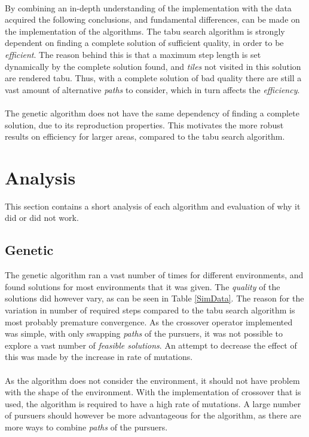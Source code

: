 \\By combining an in-depth understanding of the implementation with the data acquired the following conclusions, and fundamental differences, can be made on the implementation of the algorithms. The tabu search algorithm is strongly dependent on finding a complete solution of sufficient quality, in order to be \emph{efficient}. The reason behind this is that a maximum step length is set dynamically by the complete solution found, and \emph{tiles} not visited in this solution are rendered tabu. Thus, with a complete solution of bad quality there are still a vast amount of alternative \emph{paths} to consider, which in turn affects the \emph{efficiency}.\\
\\The genetic algorithm does not have the same dependency of finding a complete solution, due to its reproduction properties. This motivates the more robust results on efficiency for larger areas, compared to the tabu search algorithm. 
	
\section{Analysis}
This section contains a short analysis of each algorithm and evaluation of why it did or did not work.
\subsection{Genetic}
The genetic algorithm ran a vast number of times for different environments, and found solutions for most environments that it was given. The \emph{quality} of the solutions did however vary, as can be seen in Table \ref{SimData}. The reason for the variation in number of required steps compared to the tabu search algorithm is most probably premature convergence. As the crossover operator implemented was simple, with only swapping \emph{paths} of the pursuers, it was not possible to explore a vast number of \emph{feasible solutions}. An attempt to decrease the effect of this was made by the increase in rate of mutations.\\
\\As the algorithm does not consider the environment, it should not have problem with the shape of the environment. With the implementation of crossover that is used, the algorithm is required to have a high rate of mutations. A large number of pursuers should however be more advantageous for the algorithm, as there are more ways to combine \emph{paths} of the pursuers.
